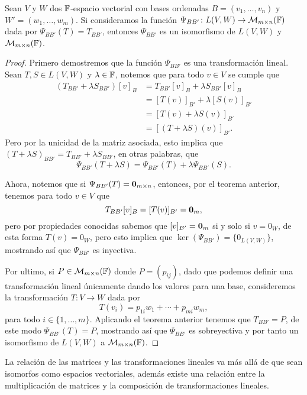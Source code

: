 \begin{teor}\label{teo:isomTrMat}
  Sean $V$ y $W$ dos $\mathbb{F}$-espacio vectorial con bases ordenadas $B = (v_1,\ldots,v_n)$ y $W' = (w_1,\ldots,w_m)$. Si consideramos la función $\Psi_{BB'}\colon L(V,W) \to \mathcal{M}_{m\times n}(\mathbb{F})$ dada por $\Psi_{BB'}(T) = T_{BB'}$, entonces $\Psi_{BB'}$ es un isomorfismo de $L(V,W)$ y $\mathcal{M}_{m\times n}(\mathbb{F})$.
\end{teor}
\begin{proof}
  Primero demostremos que la función $\Psi_{BB'}$ es una transformación lineal. Sean $T, S \in L(V,W)$ y $\lambda \in \mathbb{F}$, notemos que para todo $v \in V$ se cumple que
  \begin{align*}
    (T_{BB'} + \lambda S_{BB'})[v]_B &= T_{BB'}[v]_B + \lambda S_{BB'} [v]_B \\
      &= [T(v)]_{B'} + \lambda [S(v)]_{B'} \\
      &= [T(v) + \lambda S(v)]_{B'} \\
      &= [ (T + \lambda S)(v)]_{B'}.
  \end{align*}
  Pero por la unicidad de la matriz asociada, esto implica que $(T + \lambda S)_{BB'} = T_{BB'} + \lambda S_{BB'}$, en otras palabras, que
  \[ \Psi_{BB'}(T + \lambda S) = \Psi_{BB'}(T) + \lambda \Psi_{BB'}(S). \]

  Ahora, notemos que si $\Psi_{BB'}(T) = \mathbf{0}_{m\times n}$, entonces, por el teorema anterior, tenemos para todo $v \in V$ que  
    \[ T_{BB'}[v]_B  = [T(v)]_{B'} = \mathbf{0}_m,\]
  pero por propiedades conocidas sabemos que $[v]_{B'} = \mathbf{0}_m$ si y solo si $v = 0_W$, de esta forma $T(v) = 0_W$, pero esto implica que $\ker(\Psi_{BB'}) = \{  0_{L(V,W)} \}$, mostrando así que $\Psi_{BB'}$ es inyectiva.

  Por ultimo, si $P \in \mathcal{M}_{m\times n}(\mathbb{F})$ donde $P = (p_{ij})$, dado que podemos definir una transformación lineal únicamente dando los valores para una base, consideremos la transformación $T\colon V \to W$ dada por
  \[ T(v_i) =  p_{1i}w_1 + \cdots + p_{mi}w_m, \]
  para todo $i \in \{1,\ldots,m\}$. Aplicando el teorema anterior tenemos que $T_{BB'} = P$, de este modo $\Psi_{BB'}(T) = P$, mostrando así que $\Psi_{BB'}$ es sobreyectiva y por tanto un isomorfismo de $L(V,W)$ a $\mathcal{M}_{m\times n}(\mathbb{F})$.
\end{proof}

La relación de las matrices y las transformaciones lineales va más allá de que sean isomorfos como espacios vectoriales, además existe una relación entre la multiplicación de matrices y la composición de transformaciones lineales.

